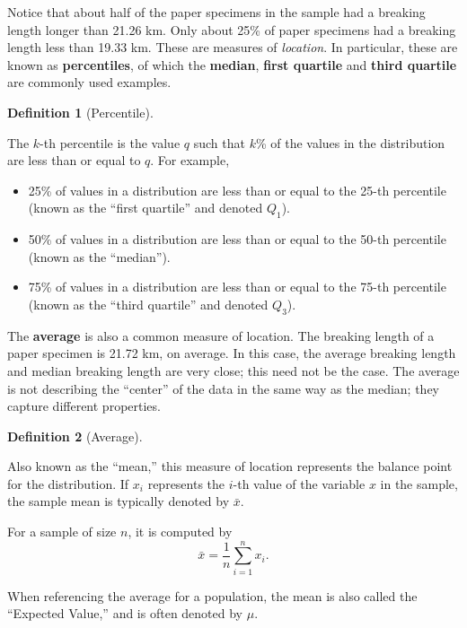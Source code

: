 \documentclass[
  letterpaper,
  DIV=11,
  numbers=noendperiod]{scrreprt}
\providecommand{\tightlist}{%
  \setlength{\itemsep}{0pt}\setlength{\parskip}{0pt}}\usepackage{longtable,booktabs,array}
\theoremstyle{plain}
\theoremstyle{definition}
\theoremstyle{definition}
\newtheorem{definition}{Definition}[chapter]
\theoremstyle{remark}
\begin{document}
Notice that about half of the paper specimens in the sample had a
breaking length longer than 21.26 km. Only about 25\% of paper specimens
had a breaking length less than 19.33 km. These are measures of
\emph{location}. In particular, these are known as \textbf{percentiles},
of which the \textbf{median}, \textbf{first quartile} and \textbf{third
quartile} are commonly used examples.

\begin{definition}[Percentile]\protect\hypertarget{def-percentile}{}\label{def-percentile}

The \(k\)-th percentile is the value \(q\) such that \(k\)\% of the
values in the distribution are less than or equal to \(q\). For example,

\begin{itemize}
\tightlist
\item
  25\% of values in a distribution are less than or equal to the 25-th
  percentile (known as the ``first quartile'' and denoted \(Q_1\)).
\item
  50\% of values in a distribution are less than or equal to the 50-th
  percentile (known as the ``median'').
\item
  75\% of values in a distribution are less than or equal to the 75-th
  percentile (known as the ``third quartile'' and denoted \(Q_3\)).
\end{itemize}

\end{definition}

The \textbf{average} is also a common measure of location. The breaking
length of a paper specimen is 21.72 km, on average. In this case, the
average breaking length and median breaking length are very close; this
need not be the case. The average is not describing the ``center'' of
the data in the same way as the median; they capture different
properties.

\begin{definition}[Average]\protect\hypertarget{def-average}{}\label{def-average}

Also known as the ``mean,'' this measure of location represents the
balance point for the distribution. If \(x_i\) represents the \(i\)-th
value of the variable \(x\) in the sample, the sample mean is typically
denoted by \(\bar{x}\).

For a sample of size \(n\), it is computed by
\[\bar{x} = \frac{1}{n}\sum_{i=1}^{n} x_i.\]

When referencing the average for a population, the mean is also called
the ``Expected Value,'' and is often denoted by \(\mu\).

\end{definition}
\end{document}
